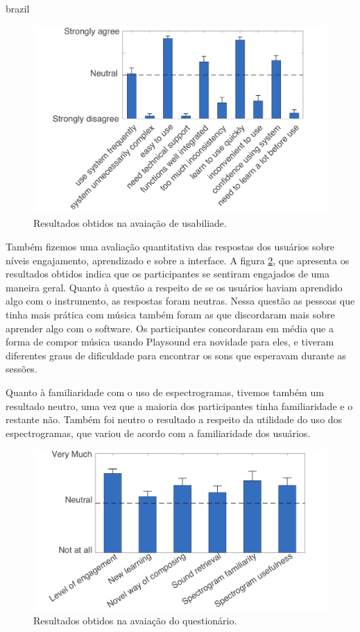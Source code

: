 \begin{otherlanguage*}{brazil}
\begin{figure}
\centering
\includegraphics[width=1\textwidth]{pictures/cap4/SUS_lower}
\caption{\label{amas}Resultados obtidos na avaiação de usabiliade.}
\label{fig:SUS}
\end{figure}

Também fizemos uma avaliação quantitativa das respostas dos usuários sobre níveis engajamento, aprendizado e sobre a interface. A figura \ref{fig:questionnaire}, que apresenta os resultados obtidos indica que os participantes se sentiram engajados de uma maneira geral. Quanto à questão a respeito de se os usuários haviam aprendido algo com o instrumento, as respostas foram neutras. Nessa questão as pessoas que tinha mais prática com música também foram as que discordaram mais sobre aprender algo com o software. Os participantes concordaram em média que a forma de compor música usando Playsound era novidade para eles, e tiveram diferentes graus de dificuldade para encontrar os sons que esperavam durante as sessões. 

Quanto à familiaridade com o uso de espectrogramas, tivemos também um resultado neutro, uma vez que a maioria dos participantes tinha familiaridade e o restante não. Também foi neutro o resultado a respeito da utilidade do uso dos espectrogramas, que variou de acordo com a familiaridade dos usuários.


\begin{figure}
\centering
\includegraphics[width=1\textwidth]{pictures/cap4/questionnaire_lower}
\caption{\label{amas}Resultados obtidos na avaiação do questionário.}
\label{fig:questionnaire}
\end{figure}


\end{otherlanguage*}
